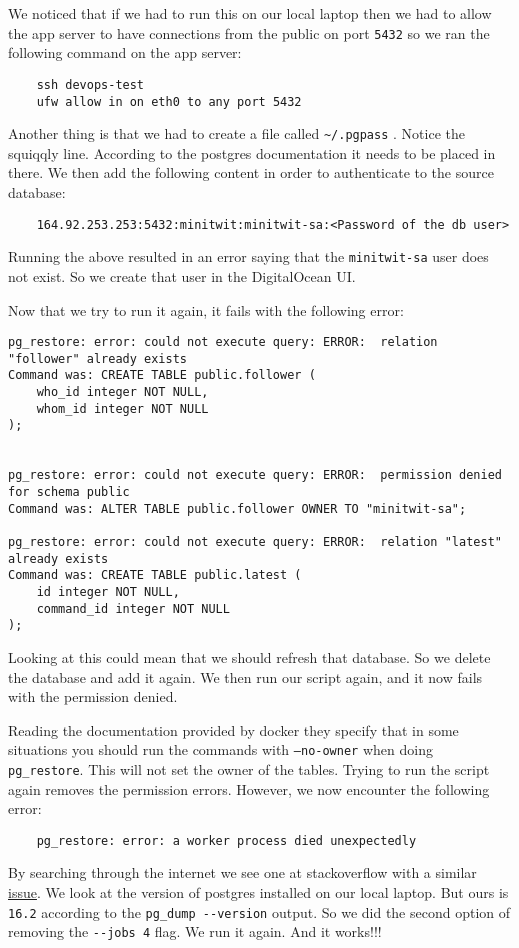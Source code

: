 We noticed that if we had to run this on our local laptop then we had to allow the app server to have connections from the public on port \texttt{5432} so we ran the following command on the app server:
\begin{verbatim}
    ssh devops-test
    ufw allow in on eth0 to any port 5432
\end{verbatim}

Another thing is that we had to create a file called \texttt{\textasciitilde{}/.pgpass} . Notice the squiqqly line. According to the postgres documentation it needs to be placed in there. We then add the following content in order to authenticate to the source database:
\begin{verbatim}
    164.92.253.253:5432:minitwit:minitwit-sa:<Password of the db user>
\end{verbatim}

Running the above resulted in an error saying that the \texttt{minitwit-sa} user does not exist. So we create that user in the DigitalOcean UI.

Now that we try to run it again, it fails with the following error:
\begin{verbatim}
pg_restore: error: could not execute query: ERROR:  relation "follower" already exists
Command was: CREATE TABLE public.follower (
    who_id integer NOT NULL,
    whom_id integer NOT NULL
);


pg_restore: error: could not execute query: ERROR:  permission denied for schema public
Command was: ALTER TABLE public.follower OWNER TO "minitwit-sa";

pg_restore: error: could not execute query: ERROR:  relation "latest" already exists
Command was: CREATE TABLE public.latest (
    id integer NOT NULL,
    command_id integer NOT NULL
);
\end{verbatim}

Looking at this could mean that we should refresh that database. So we delete the database and add it again. We then run our script again, and it now fails with the permission denied.

Reading the documentation provided by docker they specify that in some situations you should run the commands with \texttt{—no-owner} when doing \texttt{pg\_restore}. This will not set the owner of the tables. Trying to run the script again removes the permission errors. However, we now encounter the following error:

\begin{verbatim}
    pg_restore: error: a worker process died unexpectedly
\end{verbatim}
By searching through the internet we see one at stackoverflow with a similar \href{https://dba.stackexchange.com/questions/257398/pg-restore-with-jobs-flag-results-in-pg-restore-error-a-worker-process-di}{issue}. We look at the version of postgres installed on our local laptop. But ours is \texttt{16.2} according to the \texttt{pg\_dump\ -\/-version} output. So we did the second option of removing the \texttt{-\/-jobs\ 4} flag. We run it again. And it works!!!

